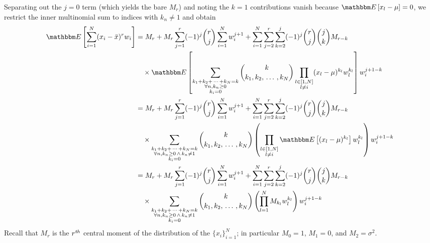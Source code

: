 \documentclass{article}
\newcommand{\E}[1]{\mathbbm E\left[#1\right]}
\begin{document}
Separating out the $j=0$ term (which yields the bare $M_r$) and noting the
$k=1$ contributions vanish because $\E{x_l - \mu} = 0$, we restrict the inner
multinomial sum to indices with $k_n \neq 1$ and obtain
\begin{align}
    \E{\sum_{i=1}^N (x_i - {\bar x})^r w_i} &=  M_r + M_r \sum_{j=1}^r  (-1)^j \binom{r}{j} \sum_{i=1}^N w_i^{j+1}
     + \sum_{i=1}^N \sum_{j=2}^r \sum_{k=2}^j (-1)^j \binom{r}{j} \binom{j}{k} M_{r-k} \\\nonumber
    & \quad  \times \E{\sum_{\substack{k_1 + k_2 + \, \cdots\, + k_N = k \\ \forall n, k_n \ge 0  \\ k_i = 0}} \binom{k}{k_1, k_2, \, \ldots\, , k_N} 
    \prod_{\substack{l \in [1,N] \\ l \neq i}} (x_l - \mu)^{k_l} w_l^{k_l}} w_i^{j+1-k} \\\nonumber 
    &=  M_r + M_r \sum_{j=1}^r  (-1)^j \binom{r}{j} \sum_{i=1}^N w_i^{j+1} 
    + \sum_{i=1}^N \sum_{j=2}^r \sum_{k=2}^j (-1)^j \binom{r}{j} \binom{j}{k} M_{r-k} \\\nonumber
    & \quad  \times  \sum_{\substack{k_1 + k_2 + \, \cdots\, + k_N = k \\ \forall n, k_n \ge 0 \, \wedge \,k_n \neq 1 \\ k_i = 0}} \binom{k}{k_1, k_2, \, \ldots\,, k_N} 
    \left(\prod_{\substack{l \in [1,N] \\ l \neq i}} \E{(x_l - \mu)^{k_l}} w_l^{k_l}\right) w_i^{j+1-k} \\\nonumber 
    &=  M_r + M_r \sum_{j=1}^r  (-1)^j \binom{r}{j} \sum_{i=1}^N w_i^{j+1} 
    + \sum_{i=1}^N \sum_{j=2}^r \sum_{k=2}^j (-1)^j \binom{r}{j} \binom{j}{k} M_{r-k} \\\nonumber
    & \quad  \times  \sum_{\substack{k_1 + k_2 + \, \cdots\,  + k_N = k \\ \forall n, k_n \ge 0 \, \wedge \,k_n \neq 1 \\ k_i = 0}} \binom{k}{k_1, k_2, \, \ldots\, , k_N} 
    \left(\prod_{l=1}^N M_{k_l} w_l^{k_l}\right) w_i^{j+1-k}
\end{align}
Recall that $M_r$ is the $r^{\it th}$ central moment of the distribution of the $\{x_i\}_{i=1}^N$; in particular $M_0 = 1$, $M_1 = 0$, and $M_2 = \sigma^2$.
\end{document}
